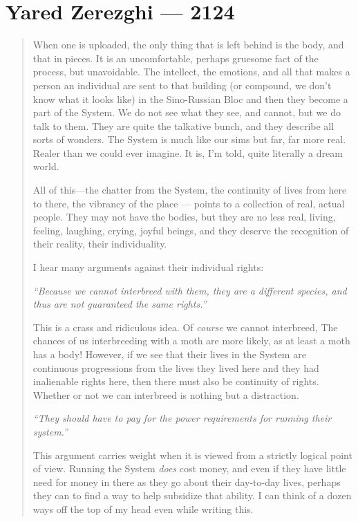 \hypertarget{yared-zerezghi-2124}{%
\chapter{Yared Zerezghi — 2124}\label{yared-zerezghi-2124}}

\begin{quote}
When one is uploaded, the only thing that is left behind is the body, and that in pieces. It is an uncomfortable, perhaps gruesome fact of the process, but unavoidable. The intellect, the emotions, and all that makes a person an individual are sent to that building (or compound, we don't know what it looks like) in the Sino-Russian Bloc and then they become a part of the System. We do not see what they see, and cannot, but we do talk to them. They are quite the talkative bunch, and they describe all sorts of wonders. The System is much like our sims but far, far more real. Realer than we could ever imagine. It is, I'm told, quite literally a dream world.

All of this---the chatter from the System, the continuity of lives from here to there, the vibrancy of the place — points to a collection of real, actual people. They may not have the bodies, but they are no less real, living, feeling, laughing, crying, joyful beings, and they deserve the recognition of their reality, their individuality.

I hear many arguments against their individual rights:\pagebreak

\emph{``Because we cannot interbreed with them, they are a different species, and thus are not guaranteed the same rights.''}

This is a crass and ridiculous idea. Of \emph{course} we cannot interbreed, The chances of us interbreeding with a moth are more likely, as at least a moth has a body! However, if we see that their lives in the System are continuous progressions from the lives they lived here and they had inalienable rights here, then there must also be continuity of rights. Whether or not we can interbreed is nothing but a distraction.

\emph{``They should have to pay for the power requirements for running their system.''}

This argument carries weight when it is viewed from a strictly logical point of view. Running the System \emph{does} cost money, and even if they have little need for money in there as they go about their day-to-day lives, perhaps they can to find a way to help subsidize that ability. I can think of a dozen ways off the top of my head even while writing this.


\end{quote}
